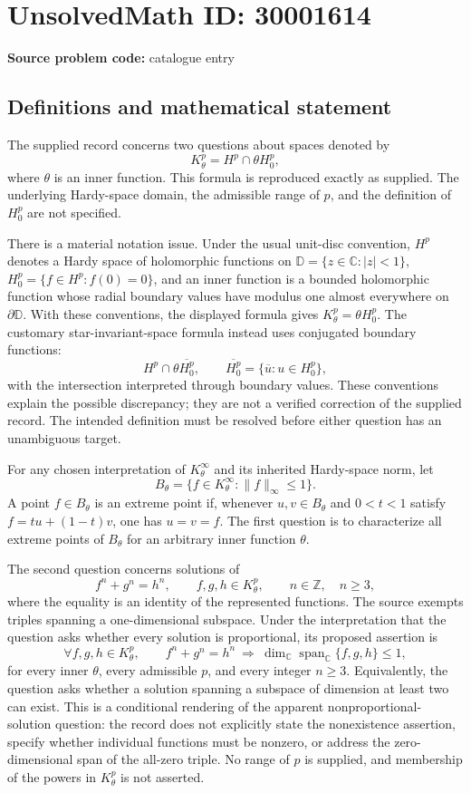 \documentclass[11pt]{article}
\newcommand{\Z}{\mathbb{Z}}
\newcommand{\C}{\mathbb{C}}
\begin{document}
\section*{UnsolvedMath ID: 30001614}
\textbf{Source problem code:} catalogue entry
\subsection{Definitions and mathematical statement}
The supplied record concerns two questions about spaces denoted by
\[
K^p_\theta=H^p\cap\theta H^p_0,
\]
where \(\theta\) is an inner function. This formula is reproduced exactly as supplied. The underlying Hardy-space domain, the admissible range of \(p\), and the definition of \(H^p_0\) are not specified.

There is a material notation issue. Under the usual unit-disc convention, \(H^p\) denotes a Hardy space of holomorphic functions on \(\mathbb D=\{z\in\C:|z|<1\}\), \(H^p_0=\{f\in H^p:f(0)=0\}\), and an inner function is a bounded holomorphic function whose radial boundary values have modulus one almost everywhere on \(\partial\mathbb D\). With these conventions, the displayed formula gives \(K^p_\theta=\theta H^p_0\). The customary star-invariant-space formula instead uses conjugated boundary functions:
\[
H^p\cap\theta\overline{H^p_0},
\qquad
\overline{H^p_0}=\{\overline{u}:u\in H^p_0\},
\]
with the intersection interpreted through boundary values. These conventions explain the possible discrepancy; they are not a verified correction of the supplied record. The intended definition must be resolved before either question has an unambiguous target.

For any chosen interpretation of \(K^\infty_\theta\) and its inherited Hardy-space norm, let
\[
B_\theta=\{f\in K^\infty_\theta:\|f\|_\infty\leq1\}.
\]
A point \(f\in B_\theta\) is an extreme point if, whenever \(u,v\in B_\theta\) and \(0<t<1\) satisfy \(f=tu+(1-t)v\), one has \(u=v=f\). The first question is to characterize all extreme points of \(B_\theta\) for an arbitrary inner function \(\theta\).

The second question concerns solutions of
\[
f^n+g^n=h^n,
\qquad f,g,h\in K^p_\theta,\qquad n\in\Z,\quad n\geq3,
\]
where the equality is an identity of the represented functions. The source exempts triples spanning a one-dimensional subspace. Under the interpretation that the question asks whether every solution is proportional, its proposed assertion is
\[
\forall f,g,h\in K^p_\theta,\qquad
f^n+g^n=h^n
\ \Longrightarrow\ 
\dim_{\C}\operatorname{span}_{\C}\{f,g,h\}\leq1,
\]
for every inner \(\theta\), every admissible \(p\), and every integer \(n\geq3\). Equivalently, the question asks whether a solution spanning a subspace of dimension at least two can exist. This is a conditional rendering of the apparent nonproportional-solution question: the record does not explicitly state the nonexistence assertion, specify whether individual functions must be nonzero, or address the zero-dimensional span of the all-zero triple. No range of \(p\) is supplied, and membership of the powers in \(K^p_\theta\) is not asserted.
\end{document}
